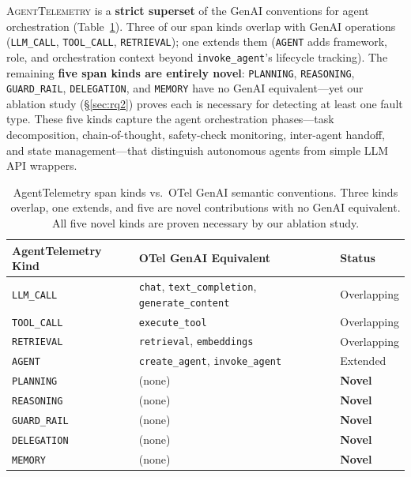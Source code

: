 \documentclass[sigplan,10pt,screen]{acmart}
\begin{document}
\textsc{AgentTelemetry} is a \textbf{strict superset} of the GenAI
conventions for agent orchestration (Table~\ref{tab:otel_comparison}).
Three of our span kinds overlap with GenAI operations
(\texttt{LLM\_CALL}, \texttt{TOOL\_CALL}, \texttt{RETRIEVAL}); one
extends them (\texttt{AGENT} adds framework, role, and orchestration
context beyond \texttt{invoke\_agent}'s lifecycle tracking).  The
remaining \textbf{five span kinds are entirely novel}: \texttt{PLANNING},
\texttt{REASONING}, \texttt{GUARD\_RAIL}, \texttt{DELEGATION}, and
\texttt{MEMORY} have no GenAI equivalent---yet our ablation study
(\S\ref{sec:rq2}) proves each is necessary for detecting at least one
fault type.  These five kinds capture the agent orchestration
phases---task decomposition, chain-of-thought, safety-check monitoring,
inter-agent handoff, and state management---that distinguish autonomous
agents from simple LLM API wrappers.

\begin{table}[t]
\centering
\small
\caption{AgentTelemetry span kinds vs.\ OTel GenAI semantic conventions.
Three kinds overlap, one extends, and five are novel contributions
with no GenAI equivalent.  All five novel kinds are proven necessary
by our ablation study.}
\label{tab:otel_comparison}
\begin{tabular}{@{}lp{2.8cm}l@{}}
\toprule
\textbf{AgentTelemetry Kind} & \textbf{OTel GenAI Equivalent} & \textbf{Status} \\
\midrule
\texttt{LLM\_CALL}   & \texttt{chat}, \texttt{text\_completion}, \texttt{generate\_content} & Overlapping \\
\texttt{TOOL\_CALL}  & \texttt{execute\_tool}            & Overlapping \\
\texttt{RETRIEVAL}   & \texttt{retrieval}, \texttt{embeddings} & Overlapping \\
\texttt{AGENT}       & \texttt{create\_agent}, \texttt{invoke\_agent} & Extended \\
\midrule
\texttt{PLANNING}    & (none) & \textbf{Novel} \\
\texttt{REASONING}   & (none) & \textbf{Novel} \\
\texttt{GUARD\_RAIL} & (none) & \textbf{Novel} \\
\texttt{DELEGATION}  & (none) & \textbf{Novel} \\
\texttt{MEMORY}      & (none) & \textbf{Novel} \\
\bottomrule
\end{tabular}
\end{table}
\end{document}

